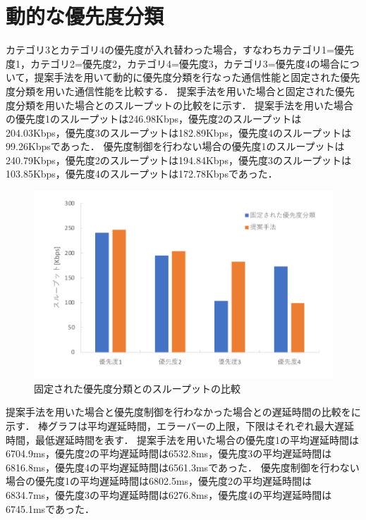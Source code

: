 \documentclass[a4paper,11pt,uplatex]{ujreport}
\begin{document}
\section{動的な優先度分類}
\label{sec:動的な優先度分類}

  カテゴリ3とカテゴリ4の優先度が入れ替わった場合，すなわちカテゴリ1=優先度1，カテゴリ2=優先度2，カテゴリ4=優先度3，カテゴリ3=優先度4の場合について，提案手法を用いて動的に優先度分類を行なった通信性能と固定された優先度分類を用いた通信性能を比較する．
  提案手法を用いた場合と固定された優先度分類を用いた場合とのスループットの比較をに示す．
  提案手法を用いた場合の優先度1のスループットは246.98Kbps，優先度2のスループットは204.03Kbps，優先度3のスループットは182.89Kbps，優先度4のスループットは99.26Kbpsであった．
  優先度制御を行わない場合の優先度1のスループットは240.79Kbps，優先度2のスループットは194.84Kbps，優先度3のスループットは103.85Kbps，優先度4のスループットは172.78Kbpsであった．

  \begin{figure}[tb]
    \centering
    \includegraphics[width=0.85\linewidth]{img/throughput_2.pdf}
    \caption{固定された優先度分類とのスループットの比較}
    \label{fig:throughput_2}
  \end{figure}

  提案手法を用いた場合と優先度制御を行わなかった場合との遅延時間の比較をに示す．
  棒グラフは平均遅延時間，エラーバーの上限，下限はそれぞれ最大遅延時間，最低遅延時間を表す．
  提案手法を用いた場合の優先度1の平均遅延時間は6704.9ms，優先度2の平均遅延時間は6532.8ms，優先度3の平均遅延時間は6816.8ms，優先度4の平均遅延時間は6561.3msであった．
  優先度制御を行わない場合の優先度1の平均遅延時間は6802.5ms，優先度2の平均遅延時間は6834.7ms，優先度3の平均遅延時間は6276.8ms，優先度4の平均遅延時間は6745.1msであった．
\end{document}
